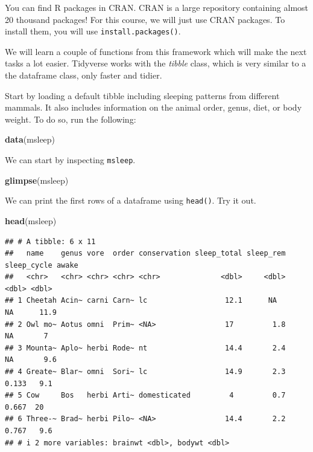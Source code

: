 \documentclass[
]{book}
\newenvironment{Shaded}{\begin{snugshade}}{\end{snugshade}}
\newcommand{\FunctionTok}[1]{\textcolor[rgb]{0.13,0.29,0.53}{\textbf{#1}}}
\newcommand{\NormalTok}[1]{#1}
\begin{document}
You can find R packages in CRAN.
CRAN is a large repository containing almost 20 thousand packages!
For this course, we will just use CRAN packages.
To install them, you will use \texttt{install.packages()}.

We will learn a couple of functions from this framework which will make the next tasks a lot easier.
Tidyverse works with the \emph{tibble} class, which is very similar to a the dataframe class, only faster and tidier.

Start by loading a default tibble including sleeping patterns from different mammals.
It also includes information on the animal order, genus, diet, or body weight.
To do so, run the following:

\begin{Shaded}
\begin{Highlighting}[]
\FunctionTok{data}\NormalTok{(msleep)}
\end{Highlighting}
\end{Shaded}

We can start by inspecting \texttt{msleep}.

\begin{Shaded}
\begin{Highlighting}[]
\FunctionTok{glimpse}\NormalTok{(msleep)}
\end{Highlighting}
\end{Shaded}

We can print the first rows of a dataframe using \texttt{head()}.
Try it out.

\begin{Shaded}
\begin{Highlighting}[]
\FunctionTok{head}\NormalTok{(msleep)}
\end{Highlighting}
\end{Shaded}

\begin{verbatim}
## # A tibble: 6 x 11
##   name    genus vore  order conservation sleep_total sleep_rem sleep_cycle awake
##   <chr>   <chr> <chr> <chr> <chr>              <dbl>     <dbl>       <dbl> <dbl>
## 1 Cheetah Acin~ carni Carn~ lc                  12.1      NA        NA      11.9
## 2 Owl mo~ Aotus omni  Prim~ <NA>                17         1.8      NA       7  
## 3 Mounta~ Aplo~ herbi Rode~ nt                  14.4       2.4      NA       9.6
## 4 Greate~ Blar~ omni  Sori~ lc                  14.9       2.3       0.133   9.1
## 5 Cow     Bos   herbi Arti~ domesticated         4         0.7       0.667  20  
## 6 Three-~ Brad~ herbi Pilo~ <NA>                14.4       2.2       0.767   9.6
## # i 2 more variables: brainwt <dbl>, bodywt <dbl>
\end{verbatim}
\end{document}

